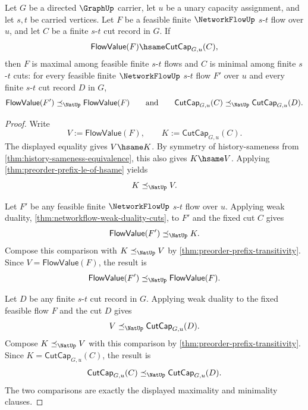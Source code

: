 \begin{theorem}
\label{thm:networkflow-equality-implies-optimality}
Let $G$ be a directed $\GraphUp$ carrier, let $u$ be a unary capacity assignment, and let $s,t$ be carried vertices. Let $F$ be a feasible finite $\NetworkFlowUp$ $s$-$t$ flow over $u$, and let $C$ be a finite $s$-$t$ cut record in $G$. If
$$
\mathsf{FlowValue}(F)\hsame\mathsf{CutCap}_{G,u}(C),
$$
then $F$ is maximal among feasible finite $s$-$t$ flows and $C$ is minimal among finite $s$-$t$ cuts: for every feasible finite $\NetworkFlowUp$ $s$-$t$ flow $F'$ over $u$ and every finite $s$-$t$ cut record $D$ in $G$,
$$
\mathsf{FlowValue}(F')
\preceq_{\NatUp}
\mathsf{FlowValue}(F)
\qquad\text{and}\qquad
\mathsf{CutCap}_{G,u}(C)
\preceq_{\NatUp}
\mathsf{CutCap}_{G,u}(D).
$$
\end{theorem}
\begin{proof}
Write
$$
V:=\mathsf{FlowValue}(F),
\qquad
K:=\mathsf{CutCap}_{G,u}(C).
$$
The displayed equality gives $V\hsame K$. By symmetry of history-sameness from \autoref{thm:history-sameness-equivalence}, this also gives $K\hsame V$. Applying \autoref{thm:preorder-prefix-le-of-hsame} yields
$$
K\preceq_{\NatUp}V.
$$

Let $F'$ be any feasible finite $\NetworkFlowUp$ $s$-$t$ flow over $u$. Applying weak duality, \autoref{thm:networkflow-weak-duality-cuts}, to $F'$ and the fixed cut $C$ gives
$$
\mathsf{FlowValue}(F')\preceq_{\NatUp}K.
$$
Compose this comparison with $K\preceq_{\NatUp}V$ by \autoref{thm:preorder-prefix-transitivity}. Since $V=\mathsf{FlowValue}(F)$, the result is
$$
\mathsf{FlowValue}(F')
\preceq_{\NatUp}
\mathsf{FlowValue}(F).
$$

Let $D$ be any finite $s$-$t$ cut record in $G$. Applying weak duality to the fixed feasible flow $F$ and the cut $D$ gives
$$
V\preceq_{\NatUp}\mathsf{CutCap}_{G,u}(D).
$$
Compose $K\preceq_{\NatUp}V$ with this comparison by \autoref{thm:preorder-prefix-transitivity}. Since $K=\mathsf{CutCap}_{G,u}(C)$, the result is
$$
\mathsf{CutCap}_{G,u}(C)
\preceq_{\NatUp}
\mathsf{CutCap}_{G,u}(D).
$$
The two comparisons are exactly the displayed maximality and minimality clauses.
\end{proof}

